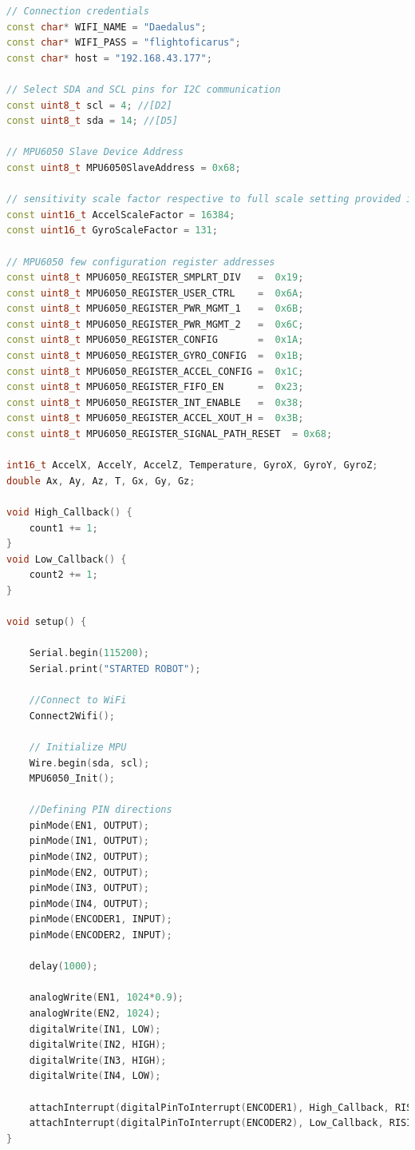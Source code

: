 \documentclass[conference]{IEEEtran}
\begin{document}
\begin{lstlisting}[language=C++, caption=Robot Code]
// Connection credentials
const char* WIFI_NAME = "Daedalus";
const char* WIFI_PASS = "flightoficarus";
const char* host = "192.168.43.177";

// Select SDA and SCL pins for I2C communication 
const uint8_t scl = 4; //[D2]
const uint8_t sda = 14; //[D5]

// MPU6050 Slave Device Address
const uint8_t MPU6050SlaveAddress = 0x68;

// sensitivity scale factor respective to full scale setting provided in datasheet 
const uint16_t AccelScaleFactor = 16384;
const uint16_t GyroScaleFactor = 131;

// MPU6050 few configuration register addresses
const uint8_t MPU6050_REGISTER_SMPLRT_DIV   =  0x19;
const uint8_t MPU6050_REGISTER_USER_CTRL    =  0x6A;
const uint8_t MPU6050_REGISTER_PWR_MGMT_1   =  0x6B;
const uint8_t MPU6050_REGISTER_PWR_MGMT_2   =  0x6C;
const uint8_t MPU6050_REGISTER_CONFIG       =  0x1A;
const uint8_t MPU6050_REGISTER_GYRO_CONFIG  =  0x1B;
const uint8_t MPU6050_REGISTER_ACCEL_CONFIG =  0x1C;
const uint8_t MPU6050_REGISTER_FIFO_EN      =  0x23;
const uint8_t MPU6050_REGISTER_INT_ENABLE   =  0x38;
const uint8_t MPU6050_REGISTER_ACCEL_XOUT_H =  0x3B;
const uint8_t MPU6050_REGISTER_SIGNAL_PATH_RESET  = 0x68;

int16_t AccelX, AccelY, AccelZ, Temperature, GyroX, GyroY, GyroZ;
double Ax, Ay, Az, T, Gx, Gy, Gz;

void High_Callback() {
    count1 += 1;
}
void Low_Callback() {
    count2 += 1;
}

void setup() {
    
    Serial.begin(115200);
    Serial.print("STARTED ROBOT");
    
    //Connect to WiFi
    Connect2Wifi();
    
    // Initialize MPU
    Wire.begin(sda, scl);
    MPU6050_Init();

    //Defining PIN directions
    pinMode(EN1, OUTPUT);
    pinMode(IN1, OUTPUT);
    pinMode(IN2, OUTPUT);
    pinMode(EN2, OUTPUT);
    pinMode(IN3, OUTPUT);
    pinMode(IN4, OUTPUT);
    pinMode(ENCODER1, INPUT);
    pinMode(ENCODER2, INPUT);
    
    delay(1000);

    analogWrite(EN1, 1024*0.9);
    analogWrite(EN2, 1024);
    digitalWrite(IN1, LOW);
    digitalWrite(IN2, HIGH);
    digitalWrite(IN3, HIGH);
    digitalWrite(IN4, LOW);
    
    attachInterrupt(digitalPinToInterrupt(ENCODER1), High_Callback, RISING);
    attachInterrupt(digitalPinToInterrupt(ENCODER2), Low_Callback, RISING);
}


\end{lstlisting}
\end{document}
